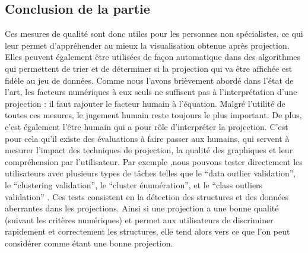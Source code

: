 \subsection{Conclusion de la partie} 
Ces mesures de qualité sont donc utiles pour les personnes non spécialistes, ce qui leur permet d’appréhender au mieux la visualisation obtenue après projection.
Elles peuvent également être utilisées de façon automatique dans des algorithmes qui permettent de trier et de déterminer si la projection qui va être affichée est fidèle au jeu de données\cite{bertini2011quality-AutomatisationAlgo}. 
\newline
Comme nous l’avons brièvement abordé dans l'état de l'art, les facteurs numériques à eux seuls ne suffisent pas à l’interprétation d’une projection : il faut rajouter le facteur humain à l’équation.
Malgré l’utilité de toutes ces mesures, le jugement humain reste toujours le plus important\cite{AndradaTatu2010visual}. De plus, c'est également l’être humain qui a pour rôle d’interpréter la projection. C’est pour cela qu’il existe des évaluations à faire passer aux humains, qui servent à mesurer l’impact des techniques de projection, la qualité des graphiques et leur compréhension par l’utilisateur. 
Par exemple ,nous pouvons tester directement les utilisateurs avec plusieurs types de tâches telles que le “data outlier validation”, le “clustering validation”, le “cluster énumération”, et le “class outliers validation” \cite{HeulotAnEvaluation}. 
Ces tests consistent en la détection des structures et des données aberrantes dans les projections.
Ainsi si une projection a une bonne qualité (suivant les critères numériques) et permet aux utilisateurs de discriminer rapidement et correctement les structures, elle tend alors vers ce que l’on peut considérer comme étant une bonne projection.
 







